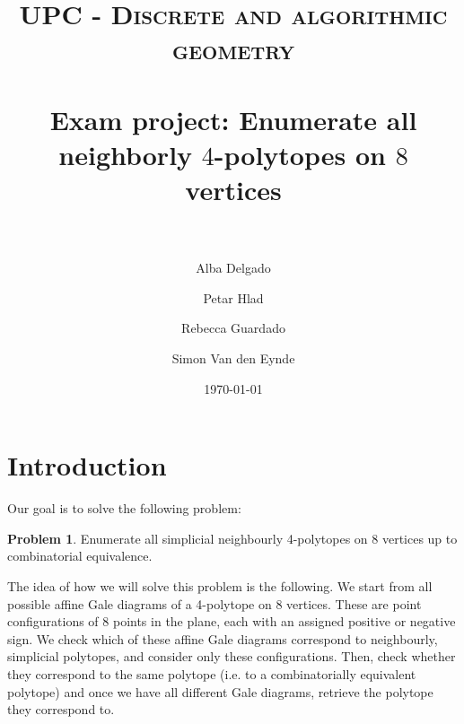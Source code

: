 \documentclass[paper=a4, fontsize=11pt]{scrartcl} %
\title{
\normalfont \normalsize
\textsc{UPC - Discrete and algorithmic geometry} \\ [25pt] %
\horrule{0.5pt} \\[0.4cm] %
\huge Exam project: Enumerate all neighborly $4$-polytopes on $8$ vertices \\ %
\horrule{2pt} \\[0.5cm] %
}
\author{Alba Delgado \and Petar Hlad \and Rebecca Guardado \and Simon Van den Eynde} %
\date{\normalsize\today} %
\theoremstyle{definition}
\newtheorem{prob}{Problem}
\begin{document}
\maketitle %



\section{Introduction}
Our goal is to solve the following problem:
\begin{prob}
Enumerate all simplicial neighbourly 4-polytopes on 8 vertices up to combinatorial equivalence.
\end{prob}
The idea of how we will solve this problem is the following. We start from all possible affine Gale diagrams of a 4-polytope on 8 vertices. These are point configurations of 8 points in the plane, each with an assigned positive or negative sign. We check which of these affine Gale diagrams correspond to neighbourly, simplicial polytopes, and consider only these configurations. Then, check whether they correspond to the same polytope (i.e. to a combinatorially equivalent polytope) and once we have all different Gale diagrams, retrieve the polytope they correspond to.


\end{document}
